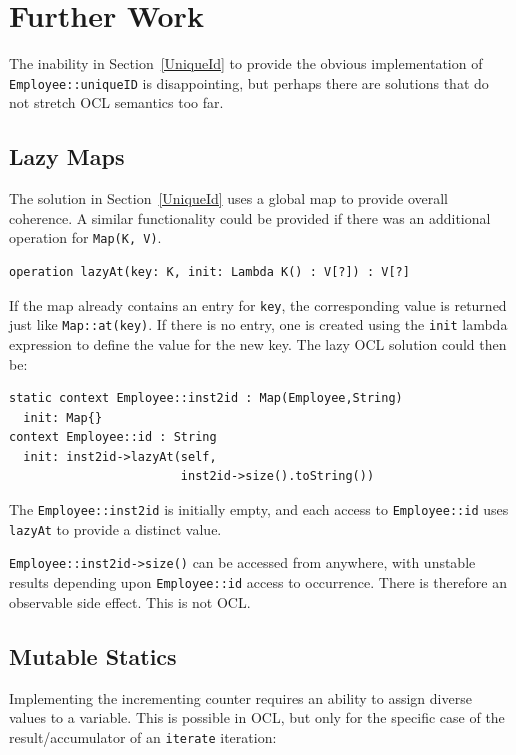 \documentclass[sigconf]{acmart}
\begin{document}
\section{Further Work}\label{Further Work}

The inability in Section~\ref{UniqueId} to provide the obvious implementation of \verb|Employee::uniqueID| is disappointing, but perhaps there are solutions that do not stretch OCL semantics too far.

\subsection{Lazy Maps}

The solution in Section~\ref{UniqueId} uses a global map to provide overall coherence. A similar functionality could be provided if there was an additional operation for \verb|Map(K, V)|.

\begin{verbatim}
operation lazyAt(key: K, init: Lambda K() : V[?]) : V[?]
\end{verbatim} 

If the map already contains an entry for \verb|key|, the corresponding value is returned just like \verb|Map::at(key)|. If there is no entry, one is created using the \verb|init| lambda expression to define the value for the new key. The lazy OCL solution could then be:

\begin{verbatim}
static context Employee::inst2id : Map(Employee,String)
  init: Map{}
context Employee::id : String
  init: inst2id->lazyAt(self,
                        inst2id->size().toString())
\end{verbatim} 

The \verb|Employee::inst2id| is initially empty, and each access to \verb|Employee::id| uses \verb|lazyAt| to provide a distinct value.

\verb|Employee::inst2id->size()| can be accessed from anywhere, with unstable results depending upon \verb|Employee::id| access to occurrence. There is therefore an observable side effect. This is not OCL.

\subsection{Mutable Statics}\label{Mutable Statics}

Implementing the incrementing counter requires an ability to assign diverse values to a variable. This is possible in OCL, but only for the specific case of the result/accumulator of an \verb|iterate| iteration:
\end{document}
